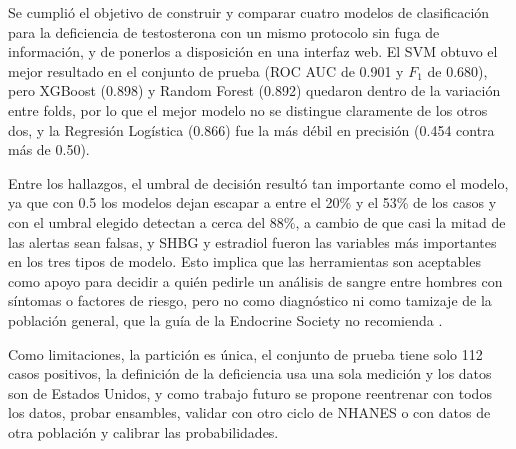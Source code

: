 \documentclass[conference]{IEEEtran}
\begin{document}
Se cumplió el objetivo de construir y comparar cuatro modelos de clasificación para la deficiencia de testosterona con un mismo protocolo sin fuga de información, y de ponerlos a disposición en una interfaz web. El SVM obtuvo el mejor resultado en el conjunto de prueba (ROC AUC de 0.901 y $F_1$ de 0.680), pero XGBoost (0.898) y Random Forest (0.892) quedaron dentro de la variación entre folds, por lo que el mejor modelo no se distingue claramente de los otros dos, y la Regresión Logística (0.866) fue la más débil en precisión (0.454 contra más de 0.50).

Entre los hallazgos, el umbral de decisión resultó tan importante como el modelo, ya que con 0.5 los modelos dejan escapar a entre el 20\% y el 53\% de los casos y con el umbral elegido detectan a cerca del 88\%, a cambio de que casi la mitad de las alertas sean falsas, y SHBG y estradiol fueron las variables más importantes en los tres tipos de modelo. Esto implica que las herramientas son aceptables como apoyo para decidir a quién pedirle un análisis de sangre entre hombres con síntomas o factores de riesgo, pero no como diagnóstico ni como tamizaje de la población general, que la guía de la Endocrine Society no recomienda \cite{bhasin2018}.

Como limitaciones, la partición es única, el conjunto de prueba tiene solo 112 casos positivos, la definición de la deficiencia usa una sola medición y los datos son de Estados Unidos, y como trabajo futuro se propone reentrenar con todos los datos, probar ensambles, validar con otro ciclo de NHANES o con datos de otra población y calibrar las probabilidades.



\end{document}
